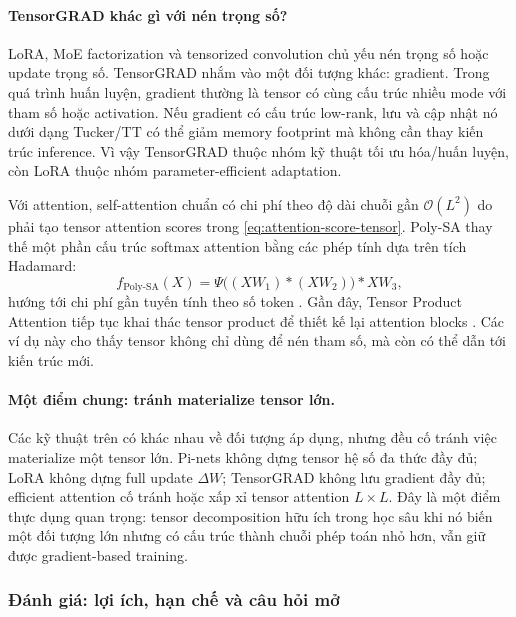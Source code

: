 \paragraph{TensorGRAD khác gì với nén trọng số?}
LoRA, MoE factorization và tensorized convolution chủ yếu nén trọng số hoặc update
trọng số. TensorGRAD nhắm vào một đối tượng khác: gradient. Trong quá trình huấn luyện,
gradient thường là tensor có cùng cấu trúc nhiều mode với tham số hoặc activation. Nếu
gradient có cấu trúc low-rank, lưu và cập nhật nó dưới dạng Tucker/TT có thể giảm memory
footprint mà không cần thay kiến trúc inference. Vì vậy TensorGRAD thuộc nhóm kỹ thuật
tối ưu hóa/huấn luyện, còn LoRA thuộc nhóm parameter-efficient adaptation.

Với attention, self-attention chuẩn có chi phí theo độ dài chuỗi gần $\mathcal{O}(L^2)$ do phải
tạo tensor attention scores trong \eqref{eq:attention-score-tensor}. Poly-SA thay thế
một phần cấu trúc softmax attention bằng các phép tính dựa trên tích Hadamard:
\begin{equation}
    f_{\mathrm{Poly\mbox{-}SA}}(X)
    =
    \Psi\big((XW_1) * (XW_2)\big) * XW_3,
    \label{eq:poly-sa}
\end{equation}
hướng tới chi phí gần tuyến tính theo số token \cite{babiloni2023polysa}. Gần đây,
Tensor Product Attention tiếp tục khai thác tensor product để thiết kế lại attention
blocks \cite{zhang2025tensorproductattention}. Các ví dụ này cho thấy tensor không chỉ
dùng để nén tham số, mà còn có thể dẫn tới kiến trúc mới.

\paragraph{Một điểm chung: tránh materialize tensor lớn.}
Các kỹ thuật trên có khác nhau về đối tượng áp dụng, nhưng đều cố tránh việc materialize
một tensor lớn. Pi-nets không dựng tensor hệ số đa thức đầy đủ; LoRA không dựng full
update $\Delta W$; TensorGRAD không lưu gradient đầy đủ; efficient attention cố tránh
hoặc xấp xỉ tensor attention $L\times L$. Đây là một điểm thực dụng quan trọng:
tensor decomposition hữu ích trong học sâu khi nó biến một đối tượng lớn nhưng có cấu
trúc thành chuỗi phép toán nhỏ hơn, vẫn giữ được gradient-based training.

\subsubsection{Đánh giá: lợi ích, hạn chế và câu hỏi mở}

